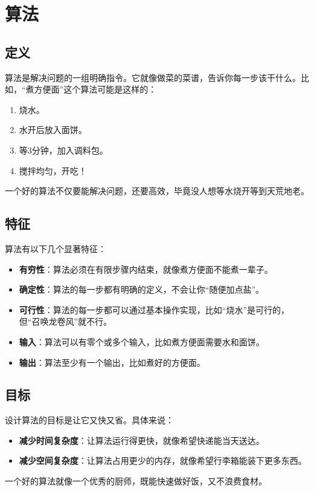 \documentclass[lang=cn,newtx,10pt,scheme=chinese]{../elegantbook}
\begin{document}
\section{算法}

\subsection{定义}
算法是解决问题的一组明确指令。它就像做菜的菜谱，告诉你每一步该干什么。比如，“煮方便面”这个算法可能是这样的：
\begin{enumerate}
    \item 烧水。
    \item 水开后放入面饼。
    \item 等3分钟，加入调料包。
    \item 搅拌均匀，开吃！
\end{enumerate}
一个好的算法不仅要能解决问题，还要高效，毕竟没人想等水烧开等到天荒地老。

\subsection{特征}
算法有以下几个显著特征：
\begin{itemize}
    \item \textbf{有穷性}：算法必须在有限步骤内结束，就像煮方便面不能煮一辈子。
    \item \textbf{确定性}：算法的每一步都有明确的定义，不会让你“随便加点盐”。
    \item \textbf{可行性}：算法的每一步都可以通过基本操作实现，比如“烧水”是可行的，但“召唤龙卷风”就不行。
    \item \textbf{输入}：算法可以有零个或多个输入，比如煮方便面需要水和面饼。
    \item \textbf{输出}：算法至少有一个输出，比如煮好的方便面。
\end{itemize}

\subsection{目标}
设计算法的目标是让它又快又省。具体来说：
\begin{itemize}
    \item \textbf{减少时间复杂度}：让算法运行得更快，就像希望快递能当天送达。
    \item \textbf{减少空间复杂度}：让算法占用更少的内存，就像希望行李箱能装下更多东西。
\end{itemize}
一个好的算法就像一个优秀的厨师，既能快速做好饭，又不浪费食材。
\end{document}

